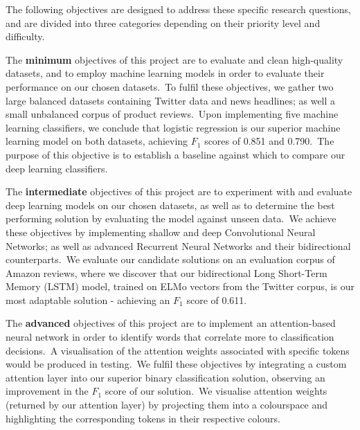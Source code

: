 \documentclass[12pt,a4paper]{article}
\begin{document}
\noindent The following objectives are designed to address these specific research questions, and are divided into three categories depending on their priority level and difficulty. 

The \textbf{minimum} objectives of this project are to evaluate and clean high-quality datasets, and to employ machine learning models in order to evaluate their performance on our chosen datasets.\ To fulfil these objectives, we gather two large balanced datasets containing Twitter data and news headlines; as well a small unbalanced corpus of product reviews.\ Upon implementing five machine learning classifiers, we conclude that logistic regression is our superior machine learning model on both datasets, achieving  $F_{1}$ scores of 0.851 and 0.790.\ The purpose of this objective is to establish a baseline against which to compare our deep learning classifiers.

The \textbf{intermediate} objectives of this project are to experiment with and evaluate deep learning models on our chosen datasets, as well as to determine the best performing solution by evaluating the model against unseen data.\ We achieve these objectives by implementing shallow and deep Convolutional Neural Networks; as well as advanced Recurrent Neural Networks and their bidirectional counterparts.\ We evaluate our candidate solutions on an evaluation corpus of Amazon reviews, where we discover that our bidirectional Long Short-Term Memory (LSTM) model, trained on ELMo vectors from the Twitter corpus, is our most adaptable solution - achieving an $F_1$ score of 0.611.
 
The \textbf{advanced} objectives of this project are to implement an attention-based neural network in order to identify words that correlate more to classification decisions.\ A visualisation of the attention weights associated with specific tokens would be produced in testing.\ We fulfil these objectives by integrating a custom attention layer into our superior binary classification solution, observing an improvement in the $F_1$ score of our solution.\ We visualise attention weights (returned by our attention layer) by projecting them into a colourspace and highlighting the corresponding tokens in their respective colours.

\end{document}
